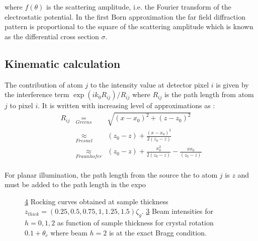 \documentclass[a4paper,10pt]{article}
\begin{document}
where $f(\theta)$ is the scattering amplitude, i.e. the Fourier transform of the electrostatic potential.
In the first Born approximation the far field diffraction pattern is proportional to the square of the scattering amplitude which is known as the differential cross section $\sigma$.


\subsection{Kinematic calculation}
The contribution of atom $j$ to the intensity value at detector pixel $i$ is given by the interference term $\exp(ik_0 R_{ij})/R_{ij}$ where  $R_{ij}$ is the path length from atom $j$ to pixel $i$.
It is written with increasing level of approximations as :
\begin{eqnarray}
R_{ij}
      &\underset{Greens}{=}& \sqrt{\left(x-x_0\right)^2+\left(z-z_0\right)^2} \\
       &\underset{Fresnel}{\approx}&     \left(z_0-z\right) + \frac{\left(x-x_0\right)^2}{2\left(z_0-z\right)} \\
       &\underset{Fraunhofer}{\approx}&  \left(z_0-z\right) + \frac{x_0^2}{2\left(z_0-z\right)} - \frac{xx_0}{\left(z_0-z\right)}  \\
\end{eqnarray}

For planar illumination, the path length from the source the to atom $j$ is $z$ and must be added to the path length in the expo


\begin{figure}[h!]
	\begin{subfigure}{\textwidth}
		\centering
		\begin{subfigure}{0.45\textwidth}
			\centering
      \def\svgwidth{\columnwidth}
			
			\caption{}\label{fig:2_beam_rocking}
		\end{subfigure}
		\begin{subfigure}{0.45\textwidth}
			\centering
      \def\svgwidth{\columnwidth}
			
			\caption{}\label{fig:2_beam_Itheta_c}
		\end{subfigure}
  \end{subfigure}
	\caption[2-beam extinction]{
		\ref{fig:2_beam_rocking} Rocking curves obtained at sample thickness $z_{thick}=\left(0.25,0.5,0.75,1,1.25,1.5\right)\zeta_g$.
		\ref{fig:2_beam_Itheta_c} Beam intensities for $h=0,1,2$ as function of sample thickness for crystal rotation $0.1+\theta_c$ where beam $h=2$ is at the exact Bragg condition.
	}\label{fig:2_beam_rocking}
\end{figure}
\end{document}
